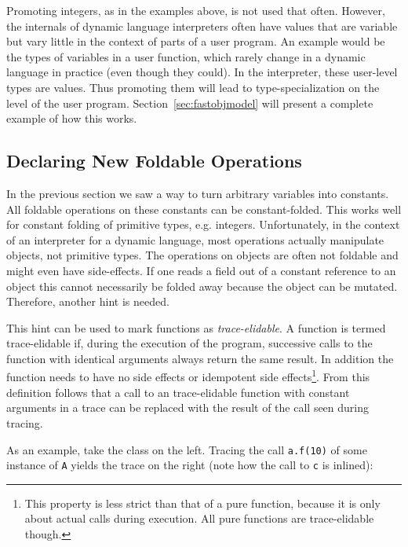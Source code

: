 \documentclass[preprint]{sigplanconf}
\begin{document}
Promoting integers, as in the examples above, is not used that often.
However, the internals of dynamic language interpreters often
have values that are variable but vary little in the context of parts of a user
program. An example would be the types of variables in a user function, which
rarely change in a dynamic language in practice (even though they could). In the
interpreter, these user-level types are values. Thus promoting them will lead
to type-specialization on the level of the user program.
Section~\ref{sec:fastobjmodel} will present a complete example of how this
works.


\subsection{Declaring New Foldable Operations}

In the previous section we saw a way to turn arbitrary variables into constants. All
foldable operations on these constants can be constant-folded. This works well for
constant folding of primitive types, e.g. integers. Unfortunately, in the context of an
interpreter for a dynamic
language, most operations actually manipulate objects, not primitive types. The
operations on objects are often not foldable and might even have side-effects. If
one reads a field out of a constant reference to an object this cannot
necessarily be folded away because the object can be mutated. Therefore, another
hint is needed.

This hint can be used to mark functions as \emph{trace-elidable}. A function is
termed trace-elidable if, during the execution of the program,
successive calls to the function with identical arguments always return the
same result. In addition the function needs to have no side effects or
idempotent side effects\footnote{This property
is less strict than that of a pure function, because it is only about actual
calls during execution. All pure functions are trace-elidable though.}.
From this definition follows that a call to an trace-elidable function with
constant arguments in a trace can be replaced with the result of the call seen during tracing.

As an example, take the class on the left. Tracing the call \texttt{a.f(10)} of
some instance of \texttt{A} yields the trace on the right (note how the call to
\texttt{c} is inlined):
\end{document}
